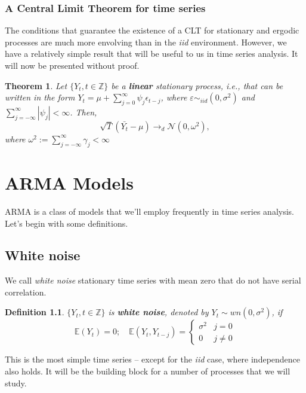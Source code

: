 \documentclass[11pt, a4paper]{report}
\theoremstyle{plain}
\newtheorem{thm}{Theorem}[section]
\theoremstyle{plain}
\newtheorem{defn}{Definition}[section]
\theoremstyle{remark}
\begin{document}
\subsection{A Central Limit Theorem for time series}

The conditions that guarantee the existence of a CLT for stationary and ergodic processes are much more envolving than in the \textit{iid} environment. However, we have a relatively simple result that will be useful to us in time series analysis. It will now be presented without proof.

\begin{thm}
	Let $\{Y_t, t \in \mathbb{Z} \}$ be a \textbf{linear} stationary process, i.e., that can be written in the form $Y_t = \mu + \sum_{j=0}^{\infty} \psi_j \epsilon_{t-j}$, where $\varepsilon \sim_{iid} (0, \sigma^2)$ and $\sum_{j = -\infty}^{\infty} | \psi_j | < \infty$. Then,
	$$ \sqrt{T}(\bar{Y_t}-\mu) \to_d \mathcal{N}(0, \omega^2), $$ 
	where $\omega^2 := \sum_{j = -\infty}^{\infty} \gamma_{j} < \infty $	
\end{thm}

\chapter{ARMA Models}

ARMA is a class of models that we'll employ frequently in time series analysis. Let's begin with some definitions.

\section{White noise}

We call \textit{white noise} stationary time series with mean zero that do not have serial correlation. 

\begin{defn}
	$\{Y_t, t \in \mathbb{Z} \}$ is \textbf{white noise}, denoted by $Y_t \sim wn(0,\sigma^2)$, if
	$$\mathbb{E}\left(Y_{t}\right)=0 ; \quad \mathbb{E}\left(Y_{t}, Y_{t-j}\right)=\left\{\begin{array}{ll}
		\sigma^{2} & j=0 \\
		0 & j \neq 0
	\end{array}\right.$$
\end{defn}

This is the most simple time series -- except for the \textit{iid} case, where independence also holds. It will be the building block for a number of processes that we will study.
\end{document}
